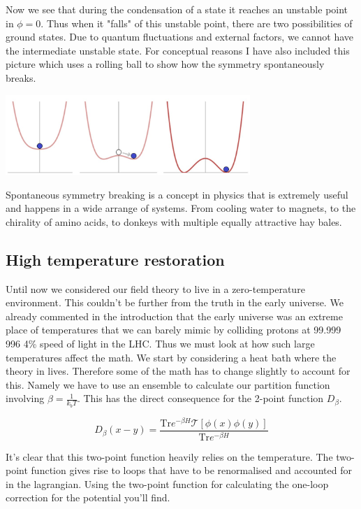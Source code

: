 \documentclass{article}
\numberwithin{equation}{section}
\begin{document}
Now we see that during the condensation of a state it reaches an unstable point in $\phi=0$.
Thus when it "falls" of this unstable point, there are two possibilities of ground states.
Due to quantum fluctuations and external factors, we cannot have the intermediate unstable state.
For conceptual reasons I have also included this picture which uses a rolling ball to show how the symmetry spontaneously breaks.

\begin{center}
\includegraphics[width=350px]{Knipsel3.PNG}    
\end{center}


Spontaneous symmetry breaking is a concept in physics that is extremely useful and happens in a wide arrange of systems.
From cooling water to magnets, to the chirality of amino acids, to donkeys with multiple equally attractive hay bales.

\subsection{High temperature restoration}

Until now we considered our field theory to live in a zero-temperature environment.
This couldn't be further from the truth in the early universe.
We already commented in the introduction that the early universe was an extreme place of temperatures that we can barely mimic by colliding protons at 99.999 996 4\% speed of light in the LHC.
Thus we must look at how such large temperatures affect the math.
We start by considering a heat bath where the theory in lives.
Therefore some of the math has to change slightly to account for this.
Namely we have to use an ensemble to calculate our partition function involving $\beta=\frac{1}{k_bT}$.
This has the direct consequence for the 2-point function $D_\beta$.

$$D_\beta (x-y)=\frac{\text{Tr} e^{-\beta H}\mathcal{T}[\phi(x)\phi(y)]}{\text{Tr} e^{-\beta H}}$$

It's clear that this two-point function heavily relies on the temperature.
The two-point function gives rise to loops that have to be renormalised and accounted for in the lagrangian.
Using the two-point function for calculating the one-loop correction for the potential you'll find.
\end{document}
